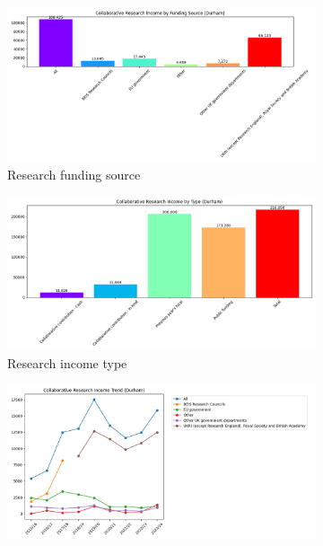 \documentclass[journal,onecolumn, 10pt,draftclsnofoot]{IEEEtran}
\begin{document}
\begin{figure}[h]
\centering
\begin{subfigure}[b]{0.48\textwidth}
    \centering
    \includegraphics[width=\textwidth]{Fig/figure3.research_funding_source.png}
    \caption{Research funding source}
    \label{fig:research-funding}
\end{subfigure}
\hfill
\begin{subfigure}[b]{0.48\textwidth}
    \centering
    \includegraphics[width=\textwidth]{Fig/figure4.research_income_type.png}
    \caption{Research income type}
    \label{fig:research-income-type}
\end{subfigure}
\vspace{0.6cm}
\begin{subfigure}[b]{0.48\textwidth}
    \centering
    \includegraphics[width=\textwidth]{Fig/figure5.research_time_trend.png}

\end{subfigure}
\end{figure}
\end{document}

